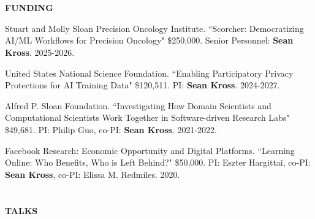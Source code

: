 
\section{} \vspace{0.2in} \textbf{FUNDING} \vspace{0.05in}

\begin{bibenum}

\item[F.4] Stuart and Molly Sloan Precision Oncology Institute. ``Scorcher: Democratizing AI/ML Workflows for Precision Oncology" \$250,000. Senior Personnel: \textbf{Sean Kross}. 2025-2026.

\item[F.3] United States National Science Foundation. ``Enabling Participatory Privacy Protections for AI Training Data" \$120,511. PI: \textbf{Sean Kross}. 2024-2027.

\item[F.2] Alfred P. Sloan Foundation. ``Investigating How Domain Scientists and Computational Scientists Work Together in Software-driven Research Labs" \$49,681. PI: Philip Guo, co-PI: \textbf{Sean Kross}. 2021-2022.

\item[F.1] Facebook Research: Economic Opportunity and Digital Platforms. ``Learning Online: Who Benefits, Who is Left Behind?" \$50,000. PI: Eszter Hargittai, co-PI: \textbf{Sean Kross}, co-PI: Elissa M. Redmiles. 2020.

\end{bibenum}

\vspace{0.1in}

\section{} \textbf{TALKS} \vspace{0.05in}


